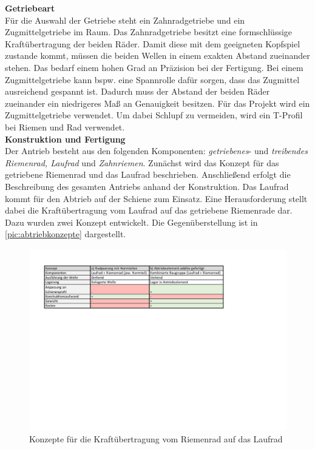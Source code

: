 \textbf{Getriebeart}\\
Für die Auswahl der Getriebe steht ein Zahnradgetriebe und ein Zugmittelgetriebe im Raum. Das Zahnradgetriebe besitzt eine formschlüssige Kraftübertragung der beiden Räder. Damit diese mit dem geeigneten Kopfspiel zustande kommt, müssen die beiden Wellen in einem exakten Abstand zueinander stehen. Das bedarf einem hohen Grad an Präzision bei der Fertigung. Bei einem Zugmittelgetriebe kann bspw. eine Spannrolle dafür sorgen, dass das Zugmittel ausreichend gespannt ist. Dadurch muss der Abstand der beiden Räder zueinander ein niedrigeres Maß an Genauigkeit besitzen. 
Für das Projekt wird ein Zugmittelgetriebe verwendet. Um dabei Schlupf zu vermeiden, wird ein T-Profil bei Riemen und Rad verwendet. 
\\

\textbf{Konstruktion und Fertigung}\\
Der Antrieb besteht aus den folgenden Komponenten: \textit{getriebenes}- und \textit{treibendes Riemenrad, Laufrad} und \textit{Zahnriemen}. Zunächst wird das Konzept für das getriebene Riemenrad und das Laufrad beschrieben. Anschließend erfolgt die Beschreibung des gesamten Antriebs anhand der Konstruktion.  
Das Laufrad kommt für den Abtrieb auf der Schiene zum Einsatz. Eine Herausforderung stellt dabei die Kraftübertragung vom Laufrad auf das getriebene Riemenrade dar. Dazu wurden zwei Konzept entwickelt. Die Gegenüberstellung ist in \autoref{pic:abtriebkonzepte} dargestellt.
\newpage

\begin{figure}[h]
	\begin{center}
		\includegraphics[width=17cm]{abtriebkonzepte.pdf}
		\caption{Konzepte für die Kraftübertragung vom Riemenrad auf das Laufrad}
		\label{pic:abtriebkonzepte}
	\end{center}
\end{figure}


